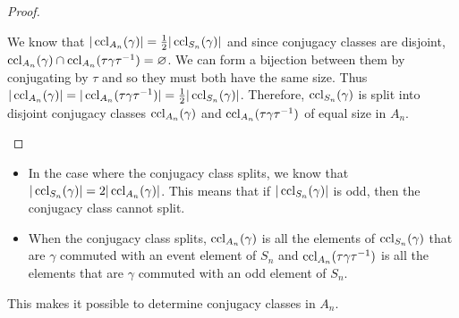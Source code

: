 \documentclass[../main.tex]{subfiles}
\begin{document}
\begin{proof}
\begin{enumerate}
      We know that $|\operatorname{ccl}_{A_n}(\gamma)| = \frac{1}{2}|\operatorname{ccl}_{S_n}(\gamma)|$ and since conjugacy classes are disjoint, $\operatorname{ccl}_{A_n}(\gamma) \cap \operatorname{ccl}_{A_n}(\tau \gamma \tau^{-1}) = \varnothing$.
      We can form a bijection between them by conjugating by $\tau$ and so they must both have the same size.
      Thus $|\operatorname{ccl}_{A_n}(\gamma)| = |\operatorname{ccl}_{A_n}(\tau \gamma \tau^{-1})| = \frac{1}{2}|\operatorname{ccl}_{S_n}(\gamma)|$.
      Therefore, $\operatorname{ccl}_{S_n}(\gamma)$ is split into disjoint conjugacy classes $\operatorname{ccl}_{A_n}(\gamma)$ and $\operatorname{ccl}_{A_n}(\tau \gamma \tau^{-1})$ of equal size in $A_n$.
  \end{enumerate}
\end{proof}
\begin{remark}
  \begin{itemize}
    \item In the case where the conjugacy class splits, we know that $|\operatorname{ccl}_{S_n}(\gamma)| = 2 |\operatorname{ccl}_{A_n}(\gamma)|$.
      This means that if $|\operatorname{ccl}_{S_n}(\gamma)|$ is odd, then the conjugacy class cannot split.
    \item When the conjugacy class splits, $\operatorname{ccl}_{A_n}(\gamma)$ is all the elements of $\operatorname{ccl}_{S_n}(\gamma)$ that are $\gamma$ commuted with an event element of $S_n$ and $\operatorname{ccl}_{A_n}(\tau \gamma \tau^{-1})$ is all the elements that are $\gamma$ commuted with an odd element of $S_n$.
  \end{itemize}
\end{remark}
This makes it possible to determine conjugacy classes in $A_n$.
\end{document}
